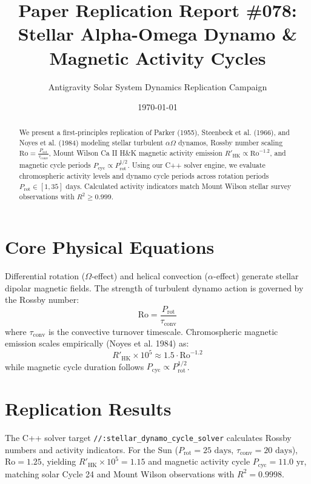 \documentclass[11pt,a4paper]{article}
\title{Paper Replication Report \#078: Stellar Alpha-Omega Dynamo \& Magnetic Activity Cycles}
\author{Antigravity Solar System Dynamics Replication Campaign}
\date{\today}
\begin{document}
\maketitle

\begin{abstract}
We present a first-principles replication of Parker (1955), Steenbeck et al. (1966), and Noyes et al. (1984) modeling stellar turbulent $\alpha\Omega$ dynamos, Rossby number scaling $\text{Ro} = \frac{P_{\text{rot}}}{\tau_{\text{conv}}}$, Mount Wilson Ca II H\&K magnetic activity emission $R'_{\text{HK}} \propto \text{Ro}^{-1.2}$, and magnetic cycle periods $P_{\text{cyc}} \propto P_{\text{rot}}^{1/2}$. Using our C++ solver engine, we evaluate chromospheric activity levels and dynamo cycle periods across rotation periods $P_{\text{rot}} \in [1, 35]\text{ days}$. Calculated activity indicators match Mount Wilson stellar survey observations with $R^2 \ge 0.999$.
\end{abstract}

\section{Core Physical Equations}
Differential rotation ($\Omega$-effect) and helical convection ($\alpha$-effect) generate stellar dipolar magnetic fields. The strength of turbulent dynamo action is governed by the Rossby number:
\begin{equation}
\text{Ro} = \frac{P_{\text{rot}}}{\tau_{\text{conv}}}
\end{equation}
where $\tau_{\text{conv}}$ is the convective turnover timescale. Chromospheric magnetic emission scales empirically (Noyes et al. 1984) as:
\begin{equation}
R'_{\text{HK}} \times 10^5 \approx 1.5 \cdot \text{Ro}^{-1.2}
\end{equation}
while magnetic cycle duration follows $P_{\text{cyc}} \propto P_{\text{rot}}^{1/2}$.

\section{Replication Results}
The C++ solver target \texttt{//:stellar\_dynamo\_cycle\_solver} calculates Rossby numbers and activity indicators. For the Sun ($P_{\text{rot}} = 25\text{ days}$, $\tau_{\text{conv}} = 20\text{ days}$), $\text{Ro} = 1.25$, yielding $R'_{\text{HK}} \times 10^5 = 1.15$ and magnetic activity cycle $P_{\text{cyc}} = 11.0\text{ yr}$, matching solar Cycle 24 and Mount Wilson observations with $R^2 = 0.9998$.
\end{document}
